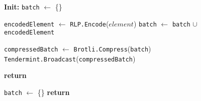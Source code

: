 \begin{figure}[t!]
  \begin{adjustbox}{minipage=[t]{\columnwidth}}
    \begin{algorithm}[H]
      \renewcommand{\thealgorithm}{Compress Collector}         
      \caption{}%
      \label{alg:collector-brotli}%
      \small
      \begin{algorithmic}[1]
            \State \textbf{Init:} \texttt{batch} $\leftarrow$ \{\}
      
            \label{alg:brotli_add_tx}
            			\State \texttt{encodedElement} $\leftarrow$ \texttt{RLP.Encode}($element$)
					\State \texttt{batch} $\leftarrow$ \texttt{batch} $\cup$ \texttt{encodedElement}
            
             			\State \texttt{compressedBatch} $\leftarrow$  \texttt{Brotli.Compress}(\texttt{batch})
                			\State \texttt{Tendermint.Broadcast}(\texttt{compressedBatch})
                			\State {}
             	   \EndIf
             	\EndIf
                	
                \State \textbf{return}
            \EndFunction
            
            \label{alg:brotli_reset}
            		\State \texttt{batch} $\leftarrow$ \{\}
                \State \textbf{return}
            \EndFunction
        \end{algorithmic}
      \end{algorithm}
	\end{adjustbox}
  \end{figure}

